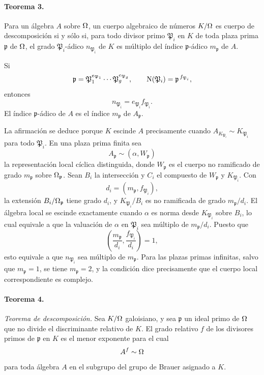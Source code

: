 \paragraph{Teorema 3.}
Para un álgebra \(A\) sobre \(\Omega\), un cuerpo algebraico de números \(K/\Omega\) es cuerpo de descomposición si y sólo si, para todo divisor primo \(\mathfrak P_i\) en \(K\) de toda plaza prima \(\mathfrak p\) de \(\Omega\), el grado \(\mathfrak P_i\)-ádico \(n_{\mathfrak P_i}\) de \(K\) es múltiplo del índice \(\mathfrak p\)-ádico \(m_{\mathfrak p}\) de \(A\).

Si
\[
        \mathfrak p=\mathfrak P_1^{e_{\mathfrak P_1}}\cdots
        \mathfrak P_g^{e_{\mathfrak P_g}},
        \qquad
        \operatorname{N}(\mathfrak P_i)=\mathfrak p^{\,f_{\mathfrak P_i}},
\]
entonces
\[
        n_{\mathfrak P_i}=e_{\mathfrak P_i}f_{\mathfrak P_i}.
\]
El índice \(\mathfrak p\)-ádico de \(A\) es el índice \(m_{\mathfrak p}\) de \(A_{\mathfrak p}\).

La afirmación se deduce porque \(K\) escinde \(A\) precisamente cuando \(A_{K_{\mathfrak P_i}}\sim K_{\mathfrak P_i}\) para todo \(\mathfrak P_i\). En una plaza prima finita sea
\[
        A_{\mathfrak p}\sim(\alpha,W_{\mathfrak p})
\]
la representación local cíclica distinguida, donde \(W_{\mathfrak p}\) es el cuerpo no ramificado de grado \(m_{\mathfrak p}\) sobre \(\Omega_{\mathfrak p}\). Sean \(B_i\) la intersección y \(C_i\) el compuesto de \(W_{\mathfrak p}\) y \(K_{\mathfrak P_i}\). Con
\[
        d_i=(m_{\mathfrak p},f_{\mathfrak P_i}),
\]
la extensión \(B_i/\Omega_{\mathfrak p}\) tiene grado \(d_i\), y \(K_{\mathfrak P_i}/B_i\) es no ramificada de grado \(m_{\mathfrak p}/d_i\). El álgebra local se escinde exactamente cuando \(\alpha\) es norma desde \(K_{\mathfrak P_i}\) sobre \(B_i\), lo cual equivale a que la valuación de \(\alpha\) en \(\mathfrak P_i\) sea múltiplo de \(m_{\mathfrak p}/d_i\). Puesto que
\[
        \left(\frac{m_{\mathfrak p}}{d_i},\frac{f_{\mathfrak P_i}}{d_i}\right)=1,
\]
esto equivale a que \(n_{\mathfrak P_i}\) sea múltiplo de \(m_{\mathfrak p}\). Para las plazas primas infinitas, salvo que \(m_{\mathfrak p}=1\), se tiene \(m_{\mathfrak p}=2\), y la condición dice precisamente que el cuerpo local correspondiente es complejo.

\paragraph{Teorema 4.}
\emph{Teorema de descomposición.} Sea \(K/\Omega\) galoisiano, y sea \(\mathfrak p\) un ideal primo de \(\Omega\) que no divide el discriminante relativo de \(K\). El grado relativo \(f\) de los divisores primos de \(\mathfrak p\) en \(K\) es el menor exponente para el cual
\[
        A^f\sim\Omega
\]
para toda álgebra \(A\) en el subgrupo del grupo de Brauer asignado a \(K\).

